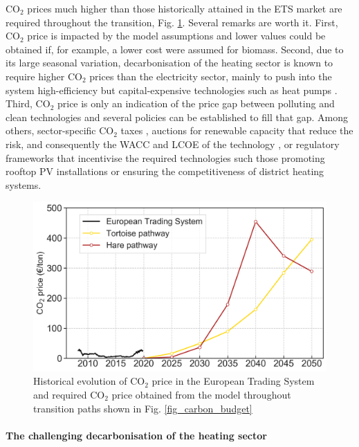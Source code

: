 \documentclass[5p]{elsarticle} %
\begin{document}
CO$_2$ prices much higher than those historically attained in the ETS market are required throughout the transition, Fig. \ref{fig_co2price}. Several remarks are worth it. First, CO$_2$ price is impacted by the model assumptions and lower values could be obtained if, for example, a lower cost were assumed for biomass. Second, due to its large seasonal variation, decarbonisation of the heating sector is known to require higher CO$_2$ prices than the electricity sector, mainly to push into the system high-efficiency but capital-expensive technologies such as heat pumps \cite{Brown_2018, Victoria_2019_storage}. Third, CO$_2$ price is only an indication of the price gap between polluting and clean technologies and several policies can be established to fill that gap. Among others, sector-specific CO$_2$ taxes \cite{Carbon_pricing_2019}, auctions for renewable capacity that reduce the risk, and consequently the WACC and LCOE of the technology \cite{Vartiainen_2019}, or regulatory frameworks that incentivise the required technologies such those promoting rooftop PV installations or ensuring the competitiveness of district heating systems.

\begin{figure}[!h]
\centering
\includegraphics[width=\columnwidth]{figures/co2_price.png}
\caption{Historical evolution of CO$_2$ price in the European Trading System \cite{ETS} and required CO$_2$ price obtained from the model throughout transition paths shown in Fig. \ref{fig_carbon_budget}} \label{fig_co2price} 
\end{figure}


\paragraph{\textbf{The challenging decarbonisation of the heating sector}} \
\end{document}

